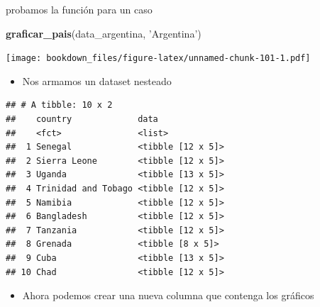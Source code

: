 \documentclass[]{book}
\newenvironment{Shaded}{\begin{snugshade}}{\end{snugshade}}
\newcommand{\DataTypeTok}[1]{\textcolor[rgb]{0.13,0.29,0.53}{#1}}
\newcommand{\DecValTok}[1]{\textcolor[rgb]{0.00,0.00,0.81}{#1}}
\newcommand{\KeywordTok}[1]{\textcolor[rgb]{0.13,0.29,0.53}{\textbf{#1}}}
\newcommand{\NormalTok}[1]{#1}
\newcommand{\OperatorTok}[1]{\textcolor[rgb]{0.81,0.36,0.00}{\textbf{#1}}}
\newcommand{\StringTok}[1]{\textcolor[rgb]{0.31,0.60,0.02}{#1}}
\providecommand{\tightlist}{%
  \setlength{\itemsep}{0pt}\setlength{\parskip}{0pt}}
\begin{document}
probamos la función para un caso

\begin{Shaded}
\begin{Highlighting}[]
\KeywordTok{graficar_pais}\NormalTok{(data_argentina, }\StringTok{'Argentina'}\NormalTok{)}
\end{Highlighting}
\end{Shaded}

\texttt{[image: bookdown\_files/figure-latex/unnamed-chunk-101-1.pdf]}

\begin{itemize}
\tightlist
\item
  Nos armamos un dataset nesteado
\end{itemize}

\begin{Shaded}
\end{Shaded}

\begin{verbatim}
## # A tibble: 10 x 2
##    country             data             
##    <fct>               <list>           
##  1 Senegal             <tibble [12 x 5]>
##  2 Sierra Leone        <tibble [12 x 5]>
##  3 Uganda              <tibble [13 x 5]>
##  4 Trinidad and Tobago <tibble [12 x 5]>
##  5 Namibia             <tibble [12 x 5]>
##  6 Bangladesh          <tibble [12 x 5]>
##  7 Tanzania            <tibble [12 x 5]>
##  8 Grenada             <tibble [8 x 5]> 
##  9 Cuba                <tibble [13 x 5]>
## 10 Chad                <tibble [12 x 5]>
\end{verbatim}

\begin{itemize}
\tightlist
\item
  Ahora podemos crear una nueva columna que contenga los gráficos
\end{itemize}

\begin{Shaded}
\end{Shaded}
\end{document}
